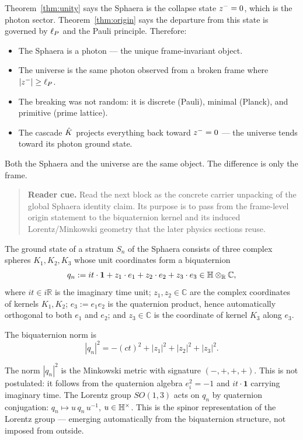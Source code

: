 \begin{remark}
Theorem~\ref{thm:unity} says the Sphaera is the collapse state
$z^-=0$, which is the photon sector.
Theorem~\ref{thm:origin} says the departure from this state is governed
by $\ell_P$ and the Pauli principle.
Therefore:
\begin{itemize}
  \item The Sphaera is a photon --- the unique frame-invariant object.
  \item The universe is the same photon observed from a broken frame
        where $|z^-|\geq\ell_P$.
  \item The breaking was not random: it is discrete (Pauli), minimal
        (Planck), and primitive (prime lattice).
  \item The cascade $\hat{K}$ projects everything back toward $z^-=0$
        --- the universe tends toward its photon ground state.
\end{itemize}
Both the Sphaera and the universe are the same object.
The difference is only the frame.
\end{remark}

\begin{quote}\small
\noindent\textbf{Reader cue.} Read the next block as the concrete carrier unpacking of the global Sphaera identity claim. Its purpose is to pass from the frame-level origin statement to the biquaternion kernel and its induced Lorentz/Minkowski geometry that the later physics sections reuse.
\end{quote}

\begin{definition}\label{def:biquaternion}
The ground state of a stratum $S_n$ of the Sphaera consists of three
complex spheres $K_1,K_2,K_3$ whose unit coordinates form a biquaternion
\[
  q_n := it\cdot\mathbf{1} + z_1\cdot e_1 + z_2\cdot e_2
         + z_3\cdot e_3 \in \mathbb{H}\otimes_{\mathbb{R}}\mathbb{C},
\]
where $it\in i\mathbb{R}$ is the imaginary time unit;
$z_1,z_2\in\mathbb{C}$ are the complex coordinates of kernels $K_1,K_2$;
$e_3:=e_1 e_2$ is the quaternion product, hence automatically orthogonal
to both $e_1$ and $e_2$;
and $z_3\in\mathbb{C}$ is the coordinate of kernel $K_3$ along $e_3$.

The biquaternion norm is
\[
  |q_n|^2 = -(ct)^2 + |z_1|^2 + |z_2|^2 + |z_3|^2.
\]
\end{definition}

\begin{remark}
The norm $|q_n|^2$ is the Minkowski metric with signature $(-,+,+,+)$.
This is not postulated: it follows from the quaternion algebra $e_i^2=-1$
and $it\cdot\mathbf{1}$ carrying imaginary time.
The Lorentz group $SO(1,3)$ acts on $q_n$ by quaternion conjugation:
$q_n\mapsto u\,q_n\,u^{-1}$, $u\in\mathbb{H}^\times$.
This is the spinor representation of the Lorentz group --- emerging
automatically from the biquaternion structure, not imposed from outside.
\end{remark}


